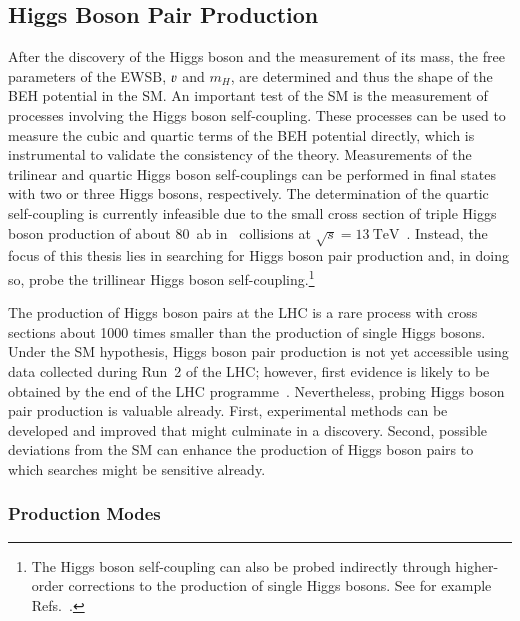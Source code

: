 \subsection{Higgs Boson Pair Production}%
\label{fig:theory_higgs_pair_prod}


After the discovery of the Higgs boson and the measurement of its mass, the free
parameters of the EWSB, $\varv$ and $m_H$, are determined and thus the shape of
the BEH potential in the SM. An important test of the SM is the measurement of
processes involving the Higgs boson self-coupling. These processes can be used
to measure the cubic and quartic terms of the BEH potential directly, which is
instrumental to validate the consistency of the theory. Measurements of the
trilinear and quartic Higgs boson self-couplings can be performed in final
states with two or three Higgs bosons, respectively. The determination of the
quartic self-coupling is currently infeasible due to the small cross section of
triple Higgs boson production of about \SI{80}{\atto\barn} in \pp~collisions at
$\sqrt{s} = \SI{13}{\TeV}$~\cite{Maltoni:2014eza}. Instead, the focus of this
thesis lies in searching for Higgs boson pair production and, in doing so, probe
the trillinear Higgs boson self-coupling.\footnote{The Higgs boson self-coupling
  can also be probed indirectly through higher-order corrections to the
  production of single Higgs bosons. See for example
  Refs.~\cite{Degrassi:2016wml,ATLAS-CONF-2022-050}.}


The production of Higgs boson pairs at the LHC is a rare process with
cross sections about 1000 times smaller than the production of single Higgs
bosons. Under the SM hypothesis, Higgs boson pair production is not yet
accessible using data collected during Run~2 of the LHC; however, first evidence
is likely to be obtained by the end of the LHC
programme~\cite{ATL-PHYS-PUB-2022-005}. Nevertheless, probing Higgs boson pair
production is valuable already. First, experimental methods can be developed and
improved that might culminate in a discovery. Second, possible deviations from
the SM can enhance the production of Higgs boson pairs to which searches might
be sensitive already.


\subsubsection{Production Modes}%

